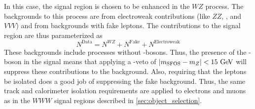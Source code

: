 In this case, the signal region is chosen to be enhanced in the $WZ$ process.
The backgrounds to this process are from electroweak contributions (like
$ZZ$, \ttV, and $VVV$) and from backgrounds with fake leptons.
The contributions to the signal region are thus parameterized as
\begin{equation}
\label{eq:wzparam}
N^{\textrm{Data}} =  N^{WZ} + N^{\textrm{Fake}} + N^{\textrm{Electroweak}}
\end{equation}
These backgrounds include processes without \z-bosons.
Thus, the presence of the \z-boson in the signal means that applying a \z-veto of 
$|m_{\textrm{SFOS}}-m_{\z}|<15\GeV$
will suppress these contributions to the background.
Also, requiring that the leptons be isolated does a good job of 
suppressing the fake background.
Thus, the same track and calorimeter isolation requirements
are applied to electrons and muons as in the $WWW$ signal regions
described in \sec\ref{sec:object_selection}.



